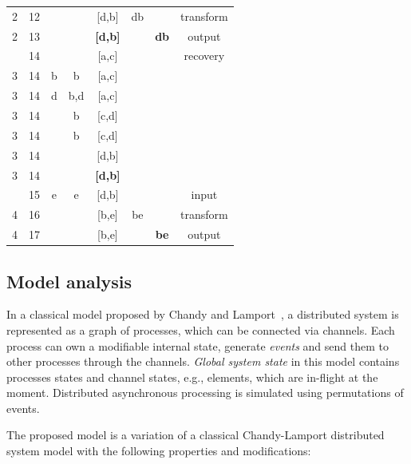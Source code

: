 \begin{table}[htbp]
\begin {center}
\begin{tabular}{c|l|c|c|c|c|c|c}
2   &   12   &       &              &   [d,b]    &  db   &           &   transform \\
2   &   13   &       &              &   {\bf [d,b]}    &       &      {\bf db}     &   output \\
\arrayrulecolor{red}\hline
3   &   14   &       &               &   [a,c]         &       &           &   recovery \\
3   &   14   &   b   &   b           &   [a,c]         &       &           &   \\
3   &   14   &   d   &   b,d         &   [a,c]         &       &           &   \\
3   &   14   &       &   b           &   [c,d]         &       &           &   \\
3   &   14   &       &   b           &   [c,d]         &       &           &   \\
3   &   14   &       &               &   [d,b]         &       &           &    \\
3   &   14   &       &               &   {\bf [d,b]}   &       &           &    \\
\arrayrulecolor{red}\hline
4   &   15   &  e    &   e           &   [d,b]   &      &           &   input \\
4   &   16   &       &              &   [b,e]   &   be    &          &   transform \\
4   &   17   &       &              &   [b,e]   &       &   {\bf be}       &   output \\
\end{tabular}
\label{concat_example}
\end {center}
\end{table}

\subsection{Model analysis}

In a classical model proposed by Chandy and Lamport~\cite{Chandy:1985:DSD:214451.214456}, a distributed system is represented as a graph of processes, which can be connected via channels. Each process can own a modifiable internal state, generate {\em events} and send them to other processes through the channels. {\em Global system state} in this model contains processes states and channel states, e.g., elements, which are in-flight at the moment. Distributed asynchronous processing is simulated using permutations of events.

The proposed model is a variation of a classical Chandy-Lamport distributed system model with the following properties and modifications:

